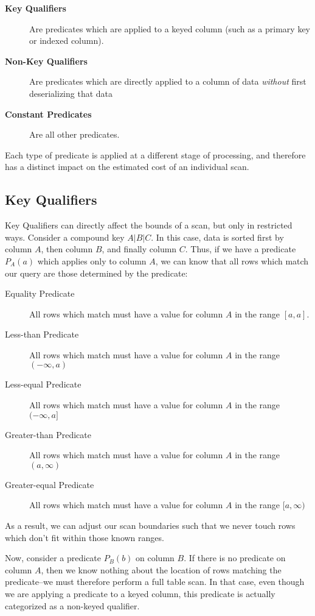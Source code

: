 \documentclass[10pt]{amsart}
\begin{document}
 \begin{description}
				 \item[\textbf{Key Qualifiers}] Are predicates which are applied to a keyed column (such as a primary key or indexed column).
				 \item[\textbf{Non-Key Qualifiers}] Are predicates which are directly applied to a column of data \emph{without} first deserializing that data
				 \item[\textbf{Constant Predicates}] Are all other predicates.
 \end{description}

Each type of predicate is applied at a different stage of processing, and therefore has a distinct impact on the estimated cost of an individual scan. 

\subsection{Key Qualifiers}
Key Qualifiers can directly affect the bounds of a scan, but only in restricted ways. Consider a compound key $A|B|C$. In this case, data is sorted first by column $A$, then column $B$, and finally column $C$. Thus, if we have a predicate $P_A(a)$ which applies only to column $A$, we can know that all rows which match our query are those determined by the predicate:

\begin{description}
				\item[Equality Predicate] All rows which match must have a value for column $A$ in the range $[a,a]$.
				\item[Less-than Predicate] All rows which match must have a value for column $A$ in the range $(-\infty,a)$
				\item[Less-equal Predicate] All rows which match must have a value for column $A$ in the range $(-\infty,a]$
				\item[Greater-than Predicate] All rows which match must have a value for column $A$ in the range $(a,\infty)$
				\item[Greater-equal Predicate] All rows which match must have a value for column $A$ in the range $[a,\infty)$
\end{description}

As a result, we can adjust our scan boundaries such that we never touch rows which don't fit within those known ranges.

Now, consider a predicate $P_B(b)$ on column $B$. If there is no predicate on column $A$, then we know nothing about the location of rows matching the predicate--we must therefore perform a full table scan. In that case, even though we are applying a predicate to a keyed column, this predicate is actually categorized as a non-keyed qualifier.
\end{document}
